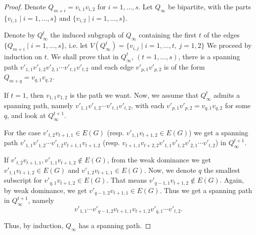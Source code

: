 \documentclass{amsart}
\theoremstyle{definition}
\begin{document}
\begin{proof}
Denote $Q_{m+i}=v_{i,1}v_{i,2}$ for $i=1,\ldots,s$.
Let $Q_{\infty}$ be bipartite, with the parts $\{v_{i,1}\mid i=1,\ldots,s\}$ and $\{v_{i,2}\mid i=1,\ldots,s\}$. 


Denote by $Q^t_{\infty}$ the induced subgraph of $Q_{\infty}$ containing the first $t$ of the edges $\{Q_{m+i}\mid i=1,\ldots,s\}$, i.e. let $V(Q^t_{\infty})=\{v_{i,j}\mid i=1,\ldots,t, \ j=1,2\}$
We proceed by induction on $t$. We shall prove that in $Q^t_{\infty}$, $(t=1,\ldots,s)$, there is a spanning path $v'_{1,1}v'_{1,2}v'_{2,1}\cdots v'_{t,1}v'_{t,2}$ and each edge $v'_{p,1}v'_{p,2}$ is 
of the form $Q_{m+q}=v_{q,1}v_{q,2}$.


If $t=1$, then $v_{1,1}v_{1,2}$ is the path we want. Now, we assume that $Q^t_{\infty}$ admits a spanning path, namely $v'_{1,1}v'_{1,2}\cdots v'_{t,1}v'_{t,2}$, with each $v'_{p,1}v'_{p,2}=v_{q,1}v_{q,2}$ for some $q$, and look at $Q^{t+1}_{\infty}$.

For the case $v'_{t,2}v_{t+1,1}\in E(G)$ 
(resp. $v'_{1,1}v_{t+1,2}\in E(G)$)
we get a spanning path 
$v'_{1,1} v'_{1,2}\cdots v'_{t,2} v_{t+1,1} v_{t+1,2}$
(resp. $v_{t+1,1} v_{t+2,2} v'_{1,1} v'_{1,2} v'_{2,1}\cdots v'_{t,2}$)
in $Q^{t+1}_{\infty}$.

If $v'_{t,2}v_{t+1,1},v'_{1,1}v_{t+1,2}\not\in E(G)$, from the weak dominance
we get $v'_{t,1}v_{t+1,2}\in E(G)$ and $v'_{1,2}v_{t+1,1}\in E(G)$. Now, we
denote $q$ the smallest subscript for $v'_{q,1}v_{t+1,2}\in E(G)$. That
means $v'_{q-1,1}v_{t+1,2}\not\in E(G)$. Again, by weak dominance,
we get $v'_{q-1,2}v_{t+1,1}\in E(G)$. Thus we get a spanning path in
$Q^{t+1}_{\infty}$, namely $$v'_{1,1}\cdots
v'_{q-1,2}v_{t+1,1}v_{t+1,2}v'_{q,1}\cdots v'_{t,2}.$$

Thus, by induction, $Q_{\infty}$ has a spanning path.%

\medskip


\end{proof}
\end{document}
